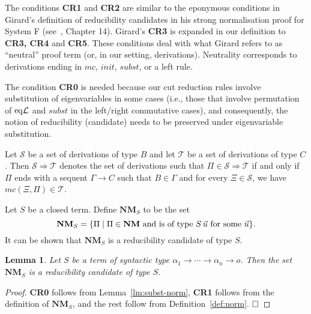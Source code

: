 \documentclass[preprint]{elsarticle}
\def\Sscr{{\mathcal S}}
\def\Tscr{{\mathcal T}}
\newcommand{\Seq}[2]{#1\longrightarrow #2}
\newcommand{\eqL}{{\rm eq}{\cal L}}
\newcommand{\ra}{\to}
\def\NM{{\mathbf{NM}}}
\newtheorem{lemma}[thm]{Lemma}
\def\qed{$\hfill\Box$}
\begin{document}
The conditions {\bf CR1} and {\bf CR2} are similar to the eponymous conditions in Girard's definition of reducibility candidates in his
strong normalisation proof for System F (see~\cite{girard89book},
Chapter 14).  Girard's {\bf CR3} is expanded in our definition to {\bf
  CR3, CR4} and {\bf CR5}.  These conditions deal with what Girard
refers to as ``neutral'' proof term (or, in our setting,
derivations). Neutrality corresponds to derivations ending in $mc$,
$init$, $subst$, or a left rule.

The condition {\bf CR0} is needed because our cut reduction rules involve
substitution of eigenvariables in some cases (i.e., those that involve
permutation of $\eqL$ and $subst$ in the left/right commutative cases), and consequently,
the notion of reducibility (candidate) needs to be preserved
under eigenvariable substitution. 

Let $\Sscr$ be a set of derivations of type $B$ and let $\Tscr$ be a
set of derivations of type $C$.  Then $\Sscr \Rightarrow \Tscr$
denotes the set of derivations such that $ \Pi \in \Sscr \Rightarrow
\Tscr $ if and only if $\Pi$ ends with a sequent $\Seq{\Gamma}{C}$
such that $B \in \Gamma$ and for every $\Xi \in \Sscr$, we have
$mc(\Xi, \Pi) \in \Tscr$.

Let $S$ be a closed term. Define $\NM_S$ to be the set
$$
\NM_S = \{\Pi \mid \Pi\in\NM\ \hbox{and is of type $S\,\vec u$ for
  some $\vec u$} \}.
$$
It can be shown that $\NM_S$ is a reducibility candidate of type $S$. 

\begin{lemma}
\label{lm:norm red}
Let $S$ be a term of syntactic type $\alpha_1\ra \cdots \ra \alpha_n
\ra o$. 
Then the set $\NM_S$ is a reducibility candidate of type $S$. 
\end{lemma}
\begin{proof}
{\bf CR0} follows from Lemma~\ref{lm:subst-norm}, {\bf CR1} follows
from the definition of $\NM_S$, and the rest follow
from Definition~\ref{def:norm}. \qed
\end{proof}
\end{document}
